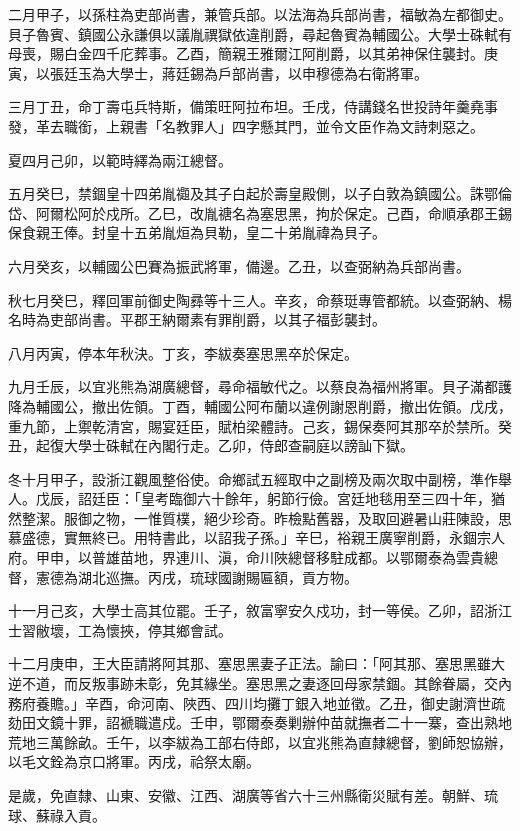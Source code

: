\begin{pinyinscope}
二月甲子，以孫柱為吏部尚書，兼管兵部。以法海為兵部尚書，福敏為左都御史。貝子魯賓、鎮國公永謙俱以議胤禩獄依違削爵，尋起魯賓為輔國公。大學士硃軾有母喪，賜白金四千庀葬事。乙酉，簡親王雅爾江阿削爵，以其弟神保住襲封。庚寅，以張廷玉為大學士，蔣廷錫為戶部尚書，以申穆德為右衛將軍。

三月丁丑，命丁壽屯兵特斯，備策旺阿拉布坦。壬戌，侍講錢名世投詩年羹堯事發，革去職銜，上親書「名教罪人」四字懸其門，並令文臣作為文詩刺惡之。

夏四月己卯，以範時繹為兩江總督。

五月癸巳，禁錮皇十四弟胤禵及其子白起於壽皇殿側，以子白敦為鎮國公。誅鄂倫岱、阿爾松阿於戍所。乙巳，改胤禟名為塞思黑，拘於保定。己酉，命順承郡王錫保食親王俸。封皇十五弟胤烜為貝勒，皇二十弟胤禕為貝子。

六月癸亥，以輔國公巴賽為振武將軍，備邊。乙丑，以查弼納為兵部尚書。

秋七月癸巳，釋回軍前御史陶彞等十三人。辛亥，命蔡珽專管都統。以查弼納、楊名時為吏部尚書。平郡王納爾素有罪削爵，以其子福彭襲封。

八月丙寅，停本年秋決。丁亥，李紱奏塞思黑卒於保定。

九月壬辰，以宜兆熊為湖廣總督，尋命福敏代之。以蔡良為福州將軍。貝子滿都護降為輔國公，撤出佐領。丁酉，輔國公阿布蘭以違例謝恩削爵，撤出佐領。戊戌，重九節，上禦乾清宮，賜宴廷臣，賦柏梁體詩。己亥，錫保奏阿其那卒於禁所。癸丑，起復大學士硃軾在內閣行走。乙卯，侍郎查嗣庭以謗訕下獄。

冬十月甲子，設浙江觀風整俗使。命鄉試五經取中之副榜及兩次取中副榜，準作舉人。戊辰，詔廷臣：「皇考臨御六十餘年，躬節行儉。宮廷地毯用至三四十年，猶然整潔。服御之物，一惟質樸，絕少珍奇。昨檢點舊器，及取回避暑山莊陳設，思慕盛德，實無終已。用特書此，以詔我子孫。」辛巳，裕親王廣寧削爵，永錮宗人府。甲申，以普雄苗地，界連川、滇，命川陜總督移駐成都。以鄂爾泰為雲貴總督，憲德為湖北巡撫。丙戌，琉球國謝賜匾額，貢方物。

十一月己亥，大學士高其位罷。壬子，敘富寧安久戍功，封一等侯。乙卯，詔浙江士習敝壞，工為懷挾，停其鄉會試。

十二月庚申，王大臣請將阿其那、塞思黑妻子正法。諭曰：「阿其那、塞思黑雖大逆不道，而反叛事跡未彰，免其緣坐。塞思黑之妻逐回母家禁錮。其餘眷屬，交內務府養贍。」辛酉，命河南、陜西、四川均攤丁銀入地並徵。乙丑，御史謝濟世疏劾田文鏡十罪，詔褫職遣戍。壬申，鄂爾泰奏剿辦仲苗就撫者二十一寨，查出熟地荒地三萬餘畝。壬午，以李紱為工部右侍郎，以宜兆熊為直隸總督，劉師恕協辦，以毛文銓為京口將軍。丙戌，祫祭太廟。

是歲，免直隸、山東、安徽、江西、湖廣等省六十三州縣衛災賦有差。朝鮮、琉球、蘇祿入貢。


\end{pinyinscope}
